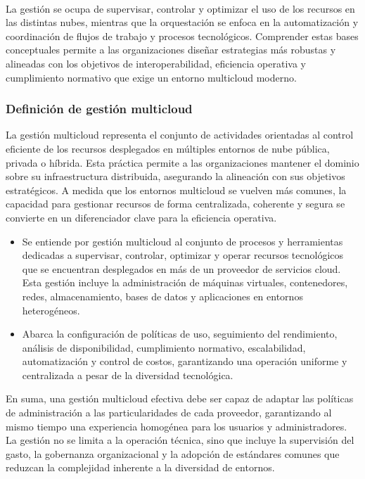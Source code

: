 {            \paragraph{}La gestión se ocupa de supervisar, controlar y optimizar el uso de los recursos en las distintas nubes, mientras que la orquestación se enfoca en la automatización y coordinación de flujos de trabajo y procesos tecnológicos. Comprender estas bases conceptuales permite a las organizaciones diseñar estrategias más robustas y alineadas con los objetivos de interoperabilidad, eficiencia operativa y cumplimiento normativo que exige un entorno multicloud moderno.
    
            \subsubsection{Definición de gestión multicloud}
                La gestión multicloud representa el conjunto de actividades orientadas al control eficiente de los recursos desplegados en múltiples entornos de nube pública, privada o híbrida. Esta práctica permite a las organizaciones mantener el dominio sobre su infraestructura distribuida, asegurando la alineación con sus objetivos estratégicos. A medida que los entornos multicloud se vuelven más comunes, la capacidad para gestionar recursos de forma centralizada, coherente y segura se convierte en un diferenciador clave para la eficiencia operativa.

                \begin{itemize}
                    \item Se entiende por gestión multicloud al conjunto de procesos y herramientas dedicadas a supervisar, controlar, optimizar y operar recursos tecnológicos que se encuentran desplegados en más de un proveedor de servicios cloud. Esta gestión incluye la administración de máquinas virtuales, contenedores, redes, almacenamiento, bases de datos y aplicaciones en entornos heterogéneos.
                    \item Abarca la configuración de políticas de uso, seguimiento del rendimiento, análisis de disponibilidad, cumplimiento normativo, escalabilidad, automatización y control de costos, garantizando una operación uniforme y centralizada a pesar de la diversidad tecnológica.
                \end{itemize}
                
                En suma, una gestión multicloud efectiva debe ser capaz de adaptar las políticas de administración a las particularidades de cada proveedor, garantizando al mismo tiempo una experiencia homogénea para los usuarios y administradores. La gestión no se limita a la operación técnica, sino que incluye la supervisión del gasto, la gobernanza organizacional y la adopción de estándares comunes que reduzcan la complejidad inherente a la diversidad de entornos.
                
}

